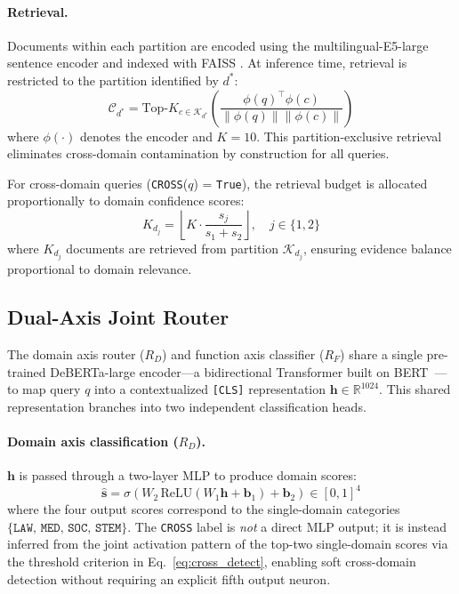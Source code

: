 \documentclass[a4paper,fleql]{cas-sc}
\begin{document}
\paragraph{Retrieval.}
Documents within each partition are encoded using the multilingual-E5-large
sentence encoder \citep{wang2024multilingual} and indexed with FAISS
\citep{johnson2019faiss}. At inference time, retrieval is restricted to the
partition identified by $d^*$:
\begin{equation}
    \mathcal{C}_{d^*} = \text{Top-}K_{c \in \mathcal{K}_{d^*}} \left(
    \frac{\phi(q)^\top \phi(c)}{\|\phi(q)\| \|\phi(c)\|} \right)
    \label{eq:retrieval}
\end{equation}
where $\phi(\cdot)$ denotes the encoder and $K = 10$. This
partition-exclusive retrieval eliminates cross-domain contamination by
construction for all queries.

For cross-domain queries (\texttt{CROSS}($q$) = \texttt{True}), the
retrieval budget is allocated proportionally to domain confidence scores:
\begin{equation}
    K_{d_j} = \left\lfloor K \cdot \frac{s_j}{s_1 + s_2} \right\rfloor,
    \quad j \in \{1, 2\}
    \label{eq:budget}
\end{equation}
where $K_{d_j}$ documents are retrieved from partition $\mathcal{K}_{d_j}$,
ensuring evidence balance proportional to domain relevance.
\subsection{Dual-Axis Joint Router}
\label{ssec:domainrouter}
The domain axis router ($R_D$) and function axis classifier ($R_F$) share
a single pre-trained DeBERTa-large encoder---a bidirectional Transformer
built on BERT~\citep{devlin2019bert}---to map query $q$ into a contextualized
\texttt{[CLS]} representation $\mathbf{h} \in \mathbb{R}^{1024}$. This
shared representation branches into two independent classification heads.

\paragraph{Domain axis classification ($R_D$).}
$\mathbf{h}$ is passed through a two-layer MLP to produce domain scores:
\begin{equation}
    \hat{\mathbf{s}} = \sigma \left( W_2\, \text{ReLU}
    (W_1 \mathbf{h} + \mathbf{b}_1) + \mathbf{b}_2 \right) \in [0,1]^4
    \label{eq:router}
\end{equation}
where the four output scores correspond to the single-domain categories
$\{\texttt{LAW},\, \texttt{MED},\, \texttt{SOC},\, \texttt{STEM}\}$.
The \texttt{CROSS} label is \emph{not} a direct MLP output; it is instead
inferred from the joint activation pattern of the top-two single-domain
scores via the threshold criterion in Eq.~\ref{eq:cross_detect}, enabling
soft cross-domain detection without requiring an explicit fifth output neuron.
\end{document}
